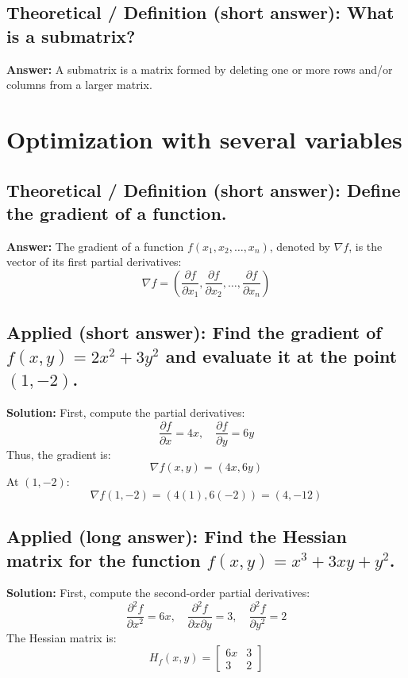 \documentclass[12pt]{article}
\begin{document}
\subsection{Theoretical / Definition (short answer): What is a submatrix?}
\textbf{Answer:} A submatrix is a matrix formed by deleting one or more rows and/or columns from a larger matrix.


\section{Optimization with several variables }

\subsection{Theoretical / Definition (short answer): Define the gradient of a function.}
\textbf{Answer:} The gradient of a function \( f(x_1, x_2, \dots, x_n) \), denoted by \( \nabla f \), is the vector of its first partial derivatives:
\[
\nabla f = \left( \frac{\partial f}{\partial x_1}, \frac{\partial f}{\partial x_2}, \dots, \frac{\partial f}{\partial x_n} \right)
\]

\subsection{Applied (short answer): Find the gradient of \( f(x, y) = 2x^2 + 3y^2 \) and evaluate it at the point \( (1, -2) \).}
\textbf{Solution:}
First, compute the partial derivatives:
\[
\frac{\partial f}{\partial x} = 4x, \quad \frac{\partial f}{\partial y} = 6y
\]
Thus, the gradient is:
\[
\nabla f(x, y) = (4x, 6y)
\]
At \( (1, -2) \):
\[
\nabla f(1, -2) = (4(1), 6(-2)) = (4, -12)
\]

\subsection{Applied (long answer): Find the Hessian matrix for the function \( f(x, y) = x^3 + 3xy + y^2 \).}
\textbf{Solution:}
First, compute the second-order partial derivatives:
\[
\frac{\partial^2 f}{\partial x^2} = 6x, \quad \frac{\partial^2 f}{\partial x \partial y} = 3, \quad \frac{\partial^2 f}{\partial y^2} = 2
\]
The Hessian matrix is:
\[
H_f(x, y) = \begin{bmatrix} 6x & 3 \\ 3 & 2 \end{bmatrix}
\]
\end{document}
